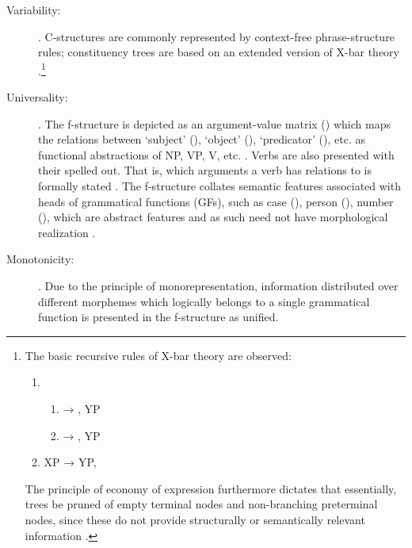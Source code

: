 \begin{description}
\item[Variability:] . 
C-structures are commonly represented by context-free phrase-structure rules; 
constituency trees are based on an extended version of X-bar theory 
\citep[42]{bresnan2016}.\footnote{The basic recursive rules of X-bar theory 
are observed:
\begin{enumerate}[nosep, leftmargin={2\footnotemargin}]
\item \begin{enumerate}
	\item {} → , YP
	\item {} → , YP
\end{enumerate}\medskip
\item XP → YP, 
\end{enumerate}

The principle of economy of expression furthermore dictates that essentially, 
trees be pruned of empty terminal nodes and non-branching preterminal nodes, 
since these do not provide structurally or semantically relevant information 
\citep[119--128]{bresnan2016}.}

\item[Universality:] . The f-structure is depicted 
as an argument-value matrix (\Avm{}) which maps the relations between 
`subject' (\Sbj{}), `object' (\Obj{}), `predicator' (\Pred{}), etc. as 
functional abstractions of NP, VP, V, etc. \citep[42]{bresnan2016}. Verbs 
are also presented with their  spelled out. That is, which 
arguments a verb has relations to is formally stated \citep[15]{bresnan2016}. 
The f-structure collates semantic features associated with heads of grammatical 
functions (GFs), such as case (\Case{}), person (\Pers{}), number (\Num{}), 
which are abstract features and as such need not have morphological realization 
\citep[43]{bresnan2016}.

\item[Monotonicity:] . Due to the principle of monorepresentation, 
information distributed over different morphemes which logically 
belongs to a single grammatical function is presented in the f-structure as 
unified.

\end{description}

